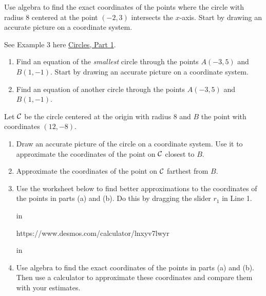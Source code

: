 \documentclass{ximera}
\newcommand{\pskip}{\vskip 0.1 in}
\begin{document}
\begin{question} \label{Q98er333}
Use algebra to find the exact coordinates of the points where the circle with radius $8$ centered at the point $(-2,3)$ intersects the $x$-axis. Start by drawing an accurate picture on a coordinate system.

\begin{explanation}
See Example 3 here \href{https://ximera.osu.edu/precalc1/PreCalculus1/Circles/Circles}{Circles, Part 1}.
\end{explanation}
\end{question}

\begin{question} \label{Qfe31111}
\begin{enumerate}
\item Find an equation of the \emph{smallest} circle through the points $A(-3,5)$ and $B(1,-1)$. Start  by drawing an accurate picture on a coordinate system.

\item Find an equation of another circle through the points $A(-3,5)$ and $B(1,-1)$.

\end{enumerate}
\end{question}


\begin{question} \label{Qcece0329}
Let ${\cal C}$ be the circle centered at the origin with radius $8$ and $B$ the point with coordinates $(12,-8)$.
\begin{enumerate}
\item Draw an accurate picture of the circle on a coordinate system. Use it to approximate the coordinates of the point on ${\cal C}$ closest to $B$.

\item Approximate the coordinates of the point on ${\cal C}$ farthest from $B$.

\item Use the worksheet below to find better approximations to the coordinates of the points in parts (a) and (b). Do this by dragging the slider $r_1$ in Line 1.

\pskip

https://www.desmos.com/calculator/lnxyv7lwyr

\pskip

\item Use algebra to find the exact coordinates of the points in parts (a) and (b). Then use a calculator to approximate these coordinates and compare them with your estimates.

\end{enumerate}
\end{question}
\end{document}
